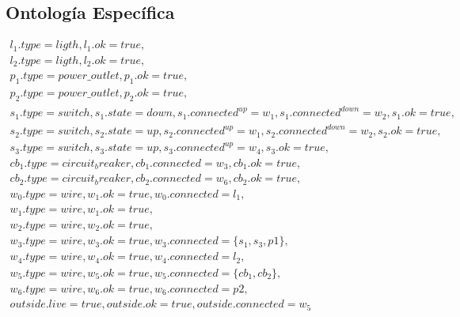 \documentclass[10pt, a4paper,spanish]{article}
\begin{document}
		\subsection{Ontología Específica}

			\begin{equation*}
				\begin{split}
					l_1.type=ligth, l_1.ok=true, \\
					l_2.type=ligth, l_2.ok=true, \\
					p_1.type=power\_outlet, p_1.ok=true, \\
					p_2.type=power\_outlet, p_2.ok=true, \\
					s_1.type=switch, s_1.state=down, s_1.connected^{up}=w_1, s_1.connected^{down}=w_2, s_1.ok=true, \\
					s_2.type=switch, s_2.state=up, s_2.connected^{up}=w_1, s_2.connected^{down}=w_2, s_2.ok=true, \\
					s_3.type=switch, s_3.state=up, s_3.connected^{up}=w_4, s_3.ok=true, \\
					cb_1.type=circuit_breaker, cb_1.connected=w_3, cb_1.ok=true,\\
					cb_2.type=circuit_breaker, cb_2.connected=w_6, cb_2.ok=true,\\
					w_0.type=wire, w_1.ok=true, w_0.connected=l_1,\\
					w_1.type=wire, w_1.ok=true, \\
					w_2.type=wire, w_2.ok=true, \\
					w_3.type=wire, w_3.ok=true, w_3.connected=\{s_1, s_3, p1\}, \\
					w_4.type=wire, w_4.ok=true, w_4.connected=l_2, \\
					w_5.type=wire, w_5.ok=true, w_5.connected=\{cb_1, cb_2\}, \\
					w_6.type=wire, w_6.ok=true, w_6.connected=p2, \\
					outside.live=true, outside.ok=true, outside.connected=w_5
				\end{split}
			\end{equation*}
\end{document}
